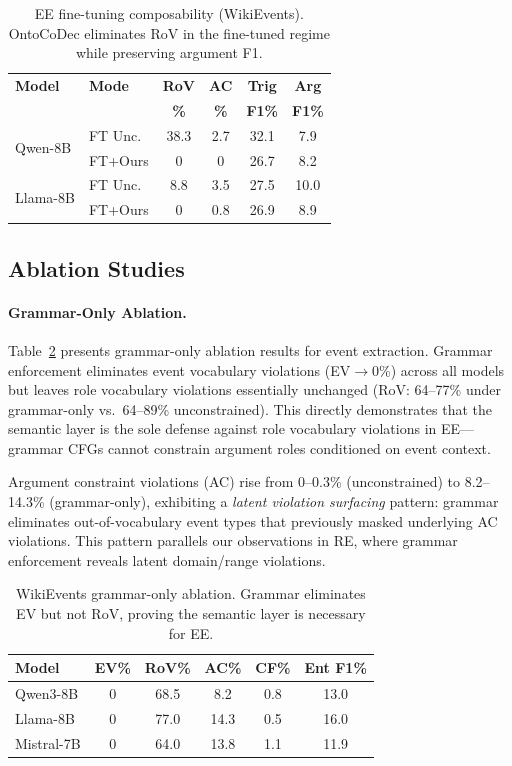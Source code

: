 \documentclass[11pt]{article}
\begin{document}
\begin{table}[t]
\centering
\small
\begin{tabular}{@{}llcccc@{}}
\toprule
\textbf{Model} & \textbf{Mode} & \textbf{RoV} & \textbf{AC} & \textbf{Trig} & \textbf{Arg} \\
& & \textbf{\%} & \textbf{\%} & \textbf{F1\%} & \textbf{F1\%} \\
\midrule
\multirow{2}{*}{Qwen-8B}
& FT Unc. & 38.3 & 2.7 & 32.1 & 7.9 \\
& FT+Ours & 0 & 0 & 26.7 & 8.2 \\
\midrule
\multirow{2}{*}{Llama-8B}
& FT Unc. & 8.8 & 3.5 & 27.5 & 10.0 \\
& FT+Ours & 0 & 0.8 & 26.9 & 8.9 \\
\bottomrule
\end{tabular}
\caption{EE fine-tuning composability (WikiEvents). OntoCoDec eliminates RoV in the fine-tuned regime while preserving argument F1.}
\label{tab:ee_ft}
\end{table}

\subsection{Ablation Studies}

\paragraph{Grammar-Only Ablation.}
Table~\ref{tab:ee_ablation} presents grammar-only ablation results for event extraction.
Grammar enforcement eliminates event vocabulary violations (EV$\to$0\%) across all models but leaves role vocabulary violations essentially unchanged (RoV: 64--77\% under grammar-only vs.\ 64--89\% unconstrained).
This directly demonstrates that the semantic layer is the sole defense against role vocabulary violations in EE---grammar CFGs cannot constrain argument roles conditioned on event context.

Argument constraint violations (AC) rise from 0--0.3\% (unconstrained) to 8.2--14.3\% (grammar-only), exhibiting a \textit{latent violation surfacing} pattern: grammar eliminates out-of-vocabulary event types that previously masked underlying AC violations.
This pattern parallels our observations in RE, where grammar enforcement reveals latent domain/range violations.

\begin{table}[t]
\centering
\small
\begin{tabular}{@{}lccccc@{}}
\toprule
\textbf{Model} & \textbf{EV\%} & \textbf{RoV\%} & \textbf{AC\%} & \textbf{CF\%} & \textbf{Ent F1\%} \\
\midrule
Qwen3-8B & 0 & 68.5 & 8.2 & 0.8 & 13.0 \\
Llama-8B & 0 & 77.0 & 14.3 & 0.5 & 16.0 \\
Mistral-7B & 0 & 64.0 & 13.8 & 1.1 & 11.9 \\
\bottomrule
\end{tabular}
\caption{WikiEvents grammar-only ablation. Grammar eliminates EV but not RoV, proving the semantic layer is necessary for EE.}
\label{tab:ee_ablation}
\end{table}
\end{document}
